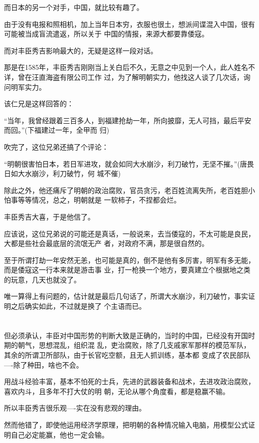 \documentclass[11pt,a4paper,onecolumn]{article}
\begin{document}
而日本的另一个对手，中国，就比较有趣了。

由于没有电报和照相机，加上当年日本穷，衣服也很土，想派间谍混入中国，很有可能被当成盲流遣返，所以关于
中国的情报，来源大都要靠倭寇。

而对丰臣秀吉影响最大的，无疑是这样一段对话。

那是在1585年，丰臣秀吉刚刚当上关白后不久，无意之中见到一个人，此人姓名不详，曾在汪直海盗有限公司工作
过，为了解明朝实力，他找这人谈了几次话，询问明军实力。

该仁兄是这样回答的：

``当年，我曾经跟着三百多人，到福建抢劫一年，所向披靡，无人可挡，最后平安而回。''(下福建过一年，全甲而
归)

吹完了，这位兄弟还搞了个评论：

``明朝很害怕日本，若日军进攻，就会如同大水崩沙，利刀破竹，无坚不摧。''(唐畏日如大水崩沙，利刀破竹，何
城不催)

除此之外，他还痛斥了明朝的政治腐败，官员贪污，老百姓流离失所，老百姓胆小怕事等等情况，总之，明朝就是
一软柿子，不捏都会烂。

丰臣秀吉大喜，于是他信了。

应该说，这位兄弟说的可能还是真话，一般说来，去当倭寇的，不太可能是良民，大都是些社会最底层的流氓无产
者，对政府不满，那是很自然的。

至于所谓打劫一年安然无恙，也可能是真的，倒不是他有多厉害，明军有多无能，而是倭寇这一行本来就是游击事
业，打一枪换一个地方，要真建立个根据地之类的玩意，几天也就没了。

唯一算得上有问题的，估计就是最后几句话了，所谓大水崩沙，利刀破竹，事实证明之后确实如此，不过就是换了
个主语而已。

\section[\thesection]{}

但必须承认，丰臣对中国形势的判断大致是正确的，当时的中国，已经没有开国时期的朝气，思想混乱，组织混
乱，吏治腐败，除了几支戚家军那样的模范军队，其余的所谓卫所部队，由于长官吃空额，且无人抓训练，基本都
变成了农民部队----除了种田，啥也不会。

用战斗经验丰富，基本不怕死的士兵，先进的武器装备和战术，去进攻政治腐败，喜欢内斗，且多年不打大仗的明
朝，无论从哪个角度看，都是稳赢不输。

所以丰臣秀吉很乐观----实在没有悲观的理由。

然而他错了，即使他运用经济学原理，把明朝的各种情况输入电脑，用模型公式证明自己必定能赢，他也一定会输。
\end{document}
